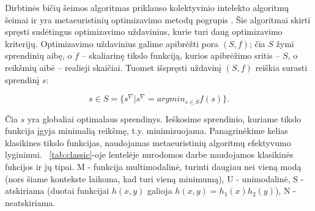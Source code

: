 \documentclass{VUMIFKompMagistrinis}
\begin{document}
Dirbtinės bičių šeimos algoritmas \cite{KaB07} priklauso kolektyvinio intelekto algoritmų šeimai ir yra metaeuristinių optimizavimo metodų pogrupis \cite{MBB11}.
Šie algoritmai skirti spręsti sudėtingus optimizavimo uždavinius, kurie turi daug optimizavimo kriterijų.
Optimizavimo uždavinius galime apibrėžti pora $(S, f)$; čia $S$ žymi sprendinių aibę, o $f$ – skaliarinę tikslo funkciją, kurios apibrėžimo sritis – $S$, o reikšmių aibė – realieji skaičiai. Tuomet išspręsti uždavinį $(S, f)$ reiškia surasti sprendinį $s$:

\begin{equation}\label{sol}
s \in  S = \{s^{\nabla} | s^{\nabla} = argmin_{s \in S} f(s)\}.
\end{equation}

Čia $s$ yra globaliai optimalaus sprendinys. Ieškosime sprendinio, kuriame tikslo funkcija įgyja minimalią reikšmę, t.y. minimizuojama. Panagrinėkime kelias klasikines tikslo funkcijas, naudojamas metaeuristinių algoritmų efektyvumo lyginimui. ~\ref{tab:classic}-oje lentelėje nurodomos darbe naudojamos klasikinės fukcijos ir jų tipai. M - funkcija multimodalinė, turinti daugiau nei vieną modą (nors šiame kontekste laikoma, kad turi vieną minimumą), U - unimodalinė, S - atskiriama (duotai funkcijai $h(x,y)$ galioja $h(x,y)=h_{1}(x)h_{2}(y)$), N - neatskiriama.
\end{document}
